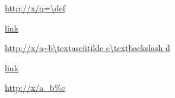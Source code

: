 \documentclass{article}
\begin{document}
%
\url{http://x/q=\def}

\href{http://x/h=\def}{link}

\url{http://x/a~b\textasciitilde c\textbackslash d}

\href{http://x/~u}{link}

\url{http://x/a\_b\%c}
\end{document}
